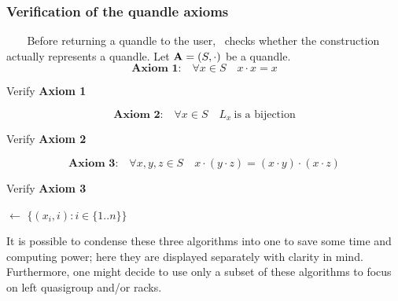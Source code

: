 \newpage
\subsubsection{Verification of the quandle axioms}\textcolor{white}{line}\newline
Before returning a quandle to the user, \Software~checks whether the construction actually represents a quandle. Let $\mathbf{A} = (S, \cdot)$ be a quandle. 
\[\textbf{Axiom 1:}\quad\forall x \in S \quad x\cdot x = x\]
\begin{algorithm}[H]
\DontPrintSemicolon
\caption{Verify \textbf{Axiom 1}}\label{alg:axiom1}
\BlankLine
\BlankLine
{}
\end{algorithm}

\[\textbf{Axiom 2:}\quad\forall x \in S \quad L_x~\text{is a bijection}\]
\begin{algorithm}[H]
\caption{Verify \textbf{Axiom 2}}\label{alg:axiom2}
\DontPrintSemicolon
{}
\BlankLine
\BlankLine
{}
\end{algorithm}
\[\textbf{Axiom 3:}\quad \forall x,y,z \in S \quad x \cdot (y \cdot z) = (x \cdot y) \cdot (x \cdot z)\]
\begin{algorithm}[H]
\DontPrintSemicolon
\caption{Verify \textbf{Axiom 3}}\label{alg:axiom3}
\BlankLine
\BlankLine
\GraphNS $\leftarrow$ $\{(x_i, i) : i \in \{1..n\}\}$\;
\end{algorithm}
\noindent It is possible to condense these three algorithms into one to save some time and computing power; here they are displayed separately with clarity in mind. Furthermore, one might decide to use only a subset of these algorithms to focus on left quasigroup and/or racks.
